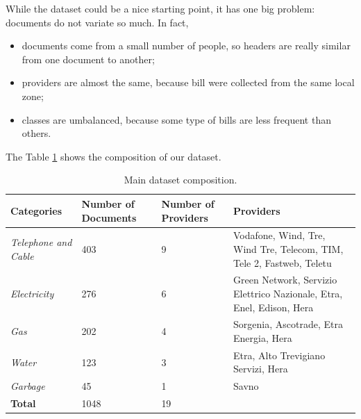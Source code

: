 \documentclass[10pt,twocolumn,letterpaper]{article}
\begin{document}
While the dataset could be a nice starting point, it has one big
problem: documents do not variate so much. In fact,
\begin{itemize}
  \item documents come from a small number of people, so headers are
    really similar from one document to another;
  \item providers are almost the same, because bill were collected
    from the same local zone;
  \item classes are umbalanced, because some type of bills are less
    frequent than others.
\end{itemize}

The Table \ref{table:main-dataset} shows the composition of our
dataset.

\bgroup
\def\arraystretch{1.5}%
\begin{table}[!h]
  \begin{center}
    \begin{tabular}{p{1.5cm} p{1.2cm} p{1.2cm} p{3cm}}
      \hline
      Categories                 & Number of Documents & Number of Providers & Providers                                                             \\ \hline
      \emph{Telephone and Cable} & 403                 & 9                   & Vodafone, Wind, Tre, Wind Tre, Telecom, TIM, Tele 2, Fastweb, Teletu  \\
      \emph{Electricity}         & 276                 & 6                   & Green Network, Servizio Elettrico Nazionale, Etra, Enel, Edison, Hera \\
      \emph{Gas}                 & 202                 & 4                   & Sorgenia, Ascotrade, Etra Energia, Hera                               \\
      \emph{Water}               & 123                 & 3                   & Etra, Alto Trevigiano Servizi, Hera                                   \\
      \emph{Garbage}             & 45                  & 1                   & Savno                                                                 \\ \hline
      \textbf{Total}             & 1048                & 19                  &                                                                       \\ \hline
    \end{tabular}
  \end{center}
  \label{table:main-dataset}
  \caption{Main dataset composition.}
\end{table}
\egroup
\end{document}
